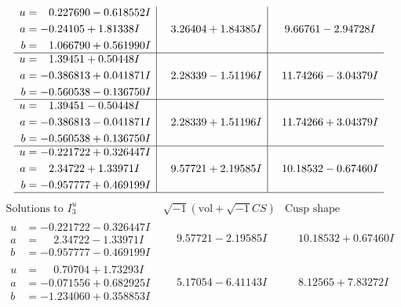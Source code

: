 \documentclass[1p]{elsarticle_modified}
\theoremstyle{definition}
\newcommand{\I}{\sqrt{-1}}
\begin{document}
$$\begin{array}{c|c|c}
\begin{aligned}
u &= \phantom{-}0.227690 - 0.618552 I \\
a &= -0.24105 + 1.81338 I \\
b &= \phantom{-}1.066790 + 0.561990 I\end{aligned}
 & \phantom{-}3.26404 + 1.84385 I & \phantom{-}9.66761 - 2.94728 I \\ \hline\begin{aligned}
u &= \phantom{-}1.39451 + 0.50448 I \\
a &= -0.386813 + 0.041871 I \\
b &= -0.560538 - 0.136750 I\end{aligned}
 & \phantom{-}2.28339 - 1.51196 I & \phantom{-}11.74266 - 3.04379 I \\ \hline\begin{aligned}
u &= \phantom{-}1.39451 - 0.50448 I \\
a &= -0.386813 - 0.041871 I \\
b &= -0.560538 + 0.136750 I\end{aligned}
 & \phantom{-}2.28339 + 1.51196 I & \phantom{-}11.74266 + 3.04379 I \\ \hline\begin{aligned}
u &= -0.221722 + 0.326447 I \\
a &= \phantom{-}2.34722 + 1.33971 I \\
b &= -0.957777 + 0.469199 I\end{aligned}
 & \phantom{-}9.57721 + 2.19585 I & \phantom{-}10.18532 - 0.67460 I\\
 \hline 
 \end{array}$$\newpage$$\begin{array}{c|c|c}  
\text{Solutions to }I^u_{3}& \I (\text{vol} + \sqrt{-1}CS) & \text{Cusp shape}\\
 \hline 
\begin{aligned}
u &= -0.221722 - 0.326447 I \\
a &= \phantom{-}2.34722 - 1.33971 I \\
b &= -0.957777 - 0.469199 I\end{aligned}
 & \phantom{-}9.57721 - 2.19585 I & \phantom{-}10.18532 + 0.67460 I \\ \hline\begin{aligned}
u &= \phantom{-}0.70704 + 1.73293 I \\
a &= -0.071556 + 0.682925 I \\
b &= -1.234060 + 0.358853 I\end{aligned}
 & \phantom{-}5.17054 - 6.41143 I & \phantom{-}8.12565 + 7.83272 I \\ \hline\begin{aligned}

\end{aligned}
\end{array}$$
\end{document}
